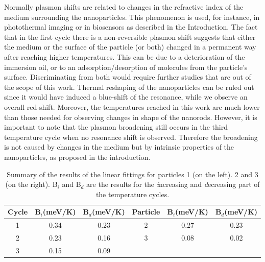 Normally plasmon shifts are related to changes in the refractive index of the
medium surrounding the nanoparticles. This phenomenon is used, for instance, in
photothermal imaging\cite{Berciaud2006,Gaiduk2010b} or in
biosensors\cite{Zijlstra2012} as described in the Introduction. The fact that in
the first cycle there is a non-reversible plasmon shift suggests that either the
medium or the surface of the particle (or both) changed in a permanent way after
reaching higher temperatures. This can be due to a deterioration of the
immersion oil, or to an adsorption/desorption of molecules from the particle's
surface. Discriminating from both would require further studies that are out of
the scope of this work. Thermal reshaping of the nanoparticles can be ruled out
since it would have induced a blue-shift of the
resonance\cite{Liu2009,Horiguchi2008}, while we observe an overall red-shift.
Moreover, the temperatures reached in this work are much lower than those needed
for observing changes in shape of the nanorods. However, it is important to note
that the plasmon broadening still occurs in the third temperature cycle when no
resonance shift is observed. Therefore the broadening is not caused by changes
in the medium but by intrinsic properties of the nanoparticles, as proposed in
the introduction.

\begin{table}
\begin{tabular}{ c | c c || c | c | c}
  Cycle & B$_i$(meV/K) & B$_d$(meV/K) & Particle & B$_i$(meV/K) & B$_d$(meV/K)\\
  \hline
  1 & 0.34 & 0.23 & 2 & 0.27 & 0.23\\
  2 & 0.23 & 0.16 & 3 & 0.08 & 0.02\\
  3 & 0.15 & 0.09 & & \\

\end{tabular}
  \caption{Summary of the results of the linear fittings for particles 1 (on
  the left). 2 and 3 (on the right). B$_i$ and B$_d$ are the results for the
  \textit{i}ncreasing and \textit{d}ecreasing part of the temperature
  cycles.}\label{table-results}
\end{table}


